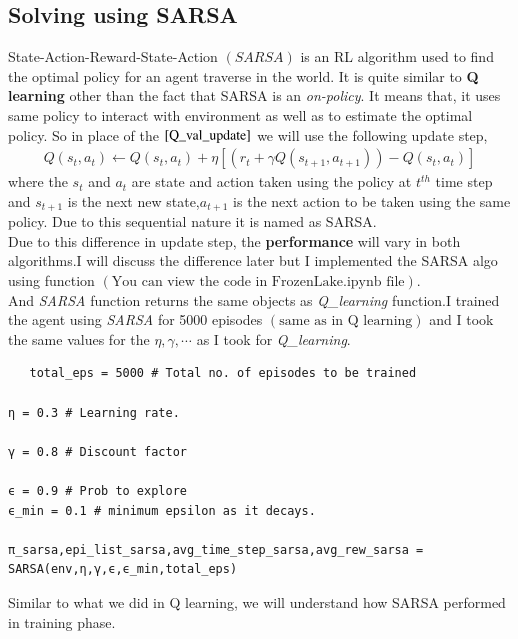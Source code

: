 \documentclass[journal,12pt,onecolumn]{IEEEtran}
\providecommand{\sbrak}[1]{\ensuremath{{}\left[#1\right]}}
\providecommand{\brak}[1]{\ensuremath{\left(#1\right)}}
\theoremstyle{remark}
\numberwithin{equation}{section}
\begin{document}
    \subsection{Solving using SARSA}
    State-Action-Reward-State-Action \brak{SARSA} is an RL algorithm used to find the optimal policy for an agent traverse in the world. It is quite similar to \textbf{Q learning} other than the fact that SARSA is an \emph{on-policy}. It means that, it uses same policy to interact with environment as well as to estimate the optimal policy. So in place of the $\eqref{Q_val_update}$ we will use the following update step,
     \begin{align}
      Q\brak{s_t,a_t} \leftarrow Q\brak{s_t,a_t} + \eta\sbrak{\brak{r_t + \gamma Q\brak{s_ {t+1},a_{t+1}}} - Q\brak{s_t,a_t}}\label{Q_val_update_sarsa}
     \end{align}
     where the $s_t$ and $a_t$ are state and action taken using the policy at $t^{th}$ time step and $s_{t+1}$ is the next new state,$a_{t+1}$ is the next action to be taken using the same policy. Due to this sequential nature it is named as SARSA.\\
     Due to this difference in update step, the \textbf{performance} will vary in both algorithms.I will discuss the difference later but I implemented the SARSA algo using  function $(\text{You can view the code in FrozenLake.ipynb file})$.\\
  And \textit{SARSA} function returns the same objects as \textit{Q\_learning} function.I trained the agent using \textit{SARSA} for 5000 episodes $\brak{\text{same as in Q learning}}$ and I took the same values for the $\eta, \gamma ,\cdots$ as I took for \textit{Q\_learning}. 	
  \begin{verbatim}
   total_eps = 5000 # Total no. of episodes to be trained

η = 0.3 # Learning rate.

γ = 0.8 # Discount factor

ϵ = 0.9 # Prob to explore
ϵ_min = 0.1 # minimum epsilon as it decays.

π_sarsa,epi_list_sarsa,avg_time_step_sarsa,avg_rew_sarsa = SARSA(env,η,γ,ϵ,ϵ_min,total_eps)
\end{verbatim}
 Similar to what we did in Q learning, we will understand how SARSA performed in training phase.
\end{document}
